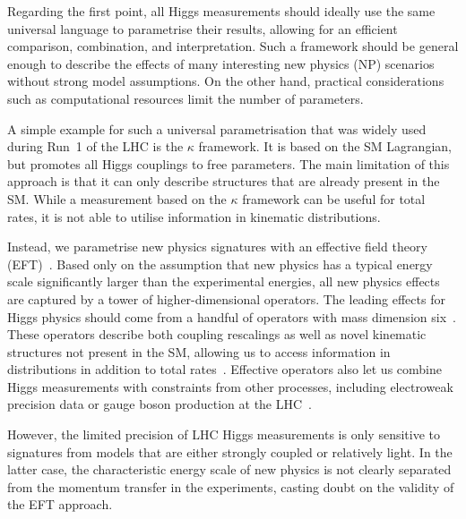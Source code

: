 \newparagraph
%
Regarding the first point, all Higgs measurements should ideally use
the same universal language to parametrise their results, allowing for
an efficient comparison, combination, and interpretation. Such a
framework should be general enough to describe the effects of many
interesting new physics (NP) scenarios without strong model
assumptions.  On the other hand, practical considerations such as
computational resources limit the number of parameters.
%

A simple example for such a universal parametrisation that was widely
used during Run~1 of the LHC is the $\kappa$ framework. It is based on
the SM Lagrangian, but promotes all Higgs couplings to free
parameters. The main limitation of this approach is that it can only
describe structures that are already present in the SM. While a
measurement based on the $\kappa$ framework can be useful for total
rates, it is not able to utilise information in kinematic
distributions.

Instead, we parametrise new physics signatures with an effective field
theory (EFT)~\cite{Coleman:1969sm, Callan:1969sn,
  Weinberg:1980wa}. Based only on the assumption that new physics has
a typical energy scale significantly larger than the experimental
energies, all new physics effects are captured by a tower of
higher-dimensional operators. The leading effects for Higgs physics
should come from a handful of operators with mass dimension
six~\cite{Burges:1983zg, Leung:1984ni, Buchmuller:1985jz}. These
operators
%
%
describe both coupling rescalings as well as novel kinematic
structures not present in the SM, allowing us to access information in
distributions in addition to total rates~\cite{Corbett:2012ja,
  Corbett:2015ksa}. Effective operators also let us combine Higgs
measurements with constraints from other processes, including
electroweak precision data or gauge boson production at the
LHC~\cite{Butter:2016cvz}.

However, the limited precision of LHC Higgs measurements is only
sensitive to signatures from models that are either strongly coupled
or relatively light. In the latter case, the characteristic energy
scale of new physics is not clearly separated from the momentum
transfer in the experiments, casting doubt on the validity of the EFT
approach.

